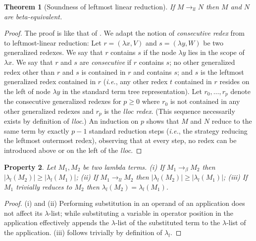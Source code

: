 \documentclass[xchauthor,chkrefs,GCNS,amsmath,amsthm,rotating,leaveRGB]{tcsg}
\theoremstyle{plain}
\newtheorem{theorem}{Theorem}[section]
\newtheorem{property}[theorem]{Property}
\theoremstyle{definition}
\newcommand{\llred}{\rightarrow_{ll}}
\begin{document}
\begin{theorem}[Soundness of leftmost linear reduction]\label{thm:soundness_leftmostlinearred}
If $M \llred N$ then $M$ and $N$ are beta-equivalent.
\end{theorem}

\begin{proof}
The proof is like that of
. We adapt the notion of
\emph{consecutive redex} from~\cite{danos-head} to  leftmost-linear
reduction: Let $r = (\lambda x, V)$ and  $s =(\lambda y, W)$ be two
generalized redexes. We say that $r$ contains $s$ if the node $\lambda y$
lies in the scope of $\lambda x$. We say that $r$ and $s$ are
\emph{consecutive} if $r$ contains $s$; no other generalized redex other than
$r$ and $s$ is contained in $r$ and contains $s$; and $s$ is the leftmost
generalized redex contained in $r$ (\textit{i.e.}, any other redex $t$
contained in $r$ resides on the left of node $\lambda y$ in the standard term
tree representation). Let $r_{0}, \ldots , r_{p}$ denote the consecutive
generalized redexes for $p\geq 0$ where $r_{0}$ is not contained in any other
generalized redexes and $r_{p}$ is the \emph{lloc redex}. (This sequence
necessarily exists by definition of \emph{lloc}.) An induction on $p$ shows
that $M$ and $N$ reduce to the same term by exactly $p-1$ standard reduction
steps (\textit{i.e.}, the strategy reducing the leftmost outermost redex),
observing that at every step, no redex can be introduced above or on the left
of the \emph{lloc}.
\end{proof}



\begin{property}\label{property:lambdalist_linearred}
Let $M_{1}, M_{2}$ be two lambda terms. (i) If $M_{1} \rightarrow _\beta
M_{2}$ then $|\lambda _{l}(M_{2})| \geq |\lambda _{l}(M_{1})|$; (ii) If
$M_{1} \llred M_{2}$ then $|\lambda _{l}(M_{2})| \geq |\lambda _{l}(M_{1})|$;
(iii) If $M_{1}$ trivially reduces to $M_{2}$ then $\lambda _{l}(M_{2}) =
\lambda _{l}(M_{1})$.
\end{property}

\begin{proof}
(i) and (ii) Performing substitution in an operand of an application does not
affect its $\lambda $-list; while substituting a variable in operator
position in the application effectively appends the $\lambda $-list of the
substituted term to the $\lambda $-list of the application. (iii) follows
trivially by definition of $\lambda _{l}$.
\end{proof}
\end{document}
